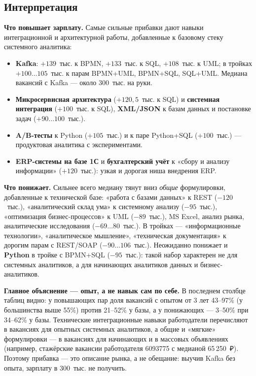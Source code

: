 \subsection{Интерпретация}

\textbf{Что повышает зарплату.} Самые сильные прибавки дают навыки интеграционной и архитектурной работы, добавленные к базовому стеку системного аналитика:
\begin{itemize}
\item \textbf{Kafka}: $+139$~тыс. к BPMN, $+133$~тыс. к SQL, $+108$~тыс. к UML; в тройках $+100\ldots105$~тыс. к парам BPMN+UML, BPMN+SQL, SQL+UML. Медиана вакансий с Kafka --- около 300~тыс. на руки.
\item \textbf{Микросервисная архитектура} ($+120{,}5$~тыс. к SQL) и \textbf{системная интеграция} ($+100$~тыс. к SQL), \textbf{XML/JSON} к базам данных и постановке задач ($+90\ldots100$~тыс.).
\item \textbf{A/B-тесты} к Python ($+105$~тыс.) и к паре Python+SQL ($+100$~тыс.) --- продуктовая аналитика с экспериментами.
\item \textbf{ERP-системы на базе 1С} и \textbf{бухгалтерский учёт} к «сбору и анализу информации» ($+120$~тыс.): узкая и дорогая ниша внедрения ERP.
\end{itemize}

\textbf{Что понижает.} Сильнее всего медиану тянут вниз \emph{общие} формулировки, добавленные к технической базе: «работа с базами данных» к REST ($-120$~тыс.), «аналитический склад ума» к системному анализу ($-95$~тыс.), «оптимизация бизнес-процессов» к UML ($-89$~тыс.), MS Excel, анализ рынка, аналитические исследования ($-69\ldots80$~тыс.). В тройках --- «информационные технологии», «аналитическое мышление», «техническая документация» к дорогим парам с REST/SOAP ($-90\ldots106$~тыс.). Неожиданно понижает и \textbf{Python} в тройке с BPMN+SQL ($-95$~тыс.): такой набор характерен не для системных аналитиков, а для начинающих аналитиков данных и бизнес-аналитиков.

\begin{callout}
\textbf{Главное объяснение --- опыт, а не навык сам по себе.} В последнем столбце таблиц видно: у повышающих пар доля вакансий с опытом от 3 лет 43--97\% (у большинства выше 55\%) против 21--52\% у базы, а у понижающих --- 3--50\% при 34--62\% у базы. Технические интеграционные навыки работодатели перечисляют в вакансиях для опытных системных аналитиков, а общие и «мягкие» формулировки --- в вакансиях для начинающих и в массовых объявлениях (например, стажёрские вакансии работодателя 6093775 с медианой 65\,250~₽). Поэтому прибавка --- это описание рынка, а не обещание: выучив Kafka без опыта, зарплату в 300~тыс. не получить.
\end{callout}
